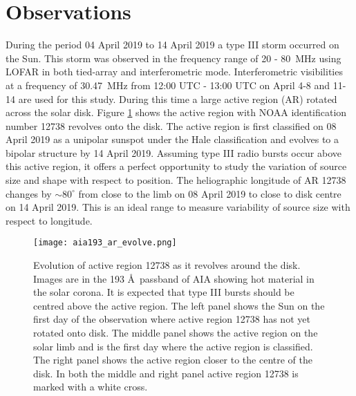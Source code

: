 \section{Observations}
\label{obsvtheory_observations}
During the period 04 April 2019 to 14 April 2019 a type III storm occurred on the Sun. This storm was observed in the frequency range of 20 - 80~MHz using LOFAR in both tied-array and interferometric mode. Interferometric visibilities at a frequency of 30.47~MHz from 12:00 UTC - 13:00 UTC on April 4-8 and 11-14 are used for this study. During this time a large active region (AR) rotated across the solar disk. Figure \ref{fig:ar_evolve} shows the active region with NOAA identification number 12738 revolves onto the disk. The active region is first classified on 08 April 2019 as a unipolar sunspot under the Hale classification and evolves to a bipolar structure by 14 April 2019. Assuming type III radio bursts occur above this active region, it offers a perfect opportunity to study the variation of source size and shape with respect to position. The heliographic longitude of AR 12738 changes by $\sim 80^\circ$ from close to the limb on 08 April 2019 to close to disk centre on 14 April 2019. This is an ideal range to measure variability of source size with respect to longitude.

\begin{figure}
\centering
\texttt{[image: aia193\_ar\_evolve.png]}
\caption[Evolution of active region 12738 as it revolves around the disk.]{Evolution of active region 12738 as it revolves around the disk. Images are in the 193 \AA \ passband of AIA showing hot material in the solar corona. It is expected that type III bursts should be centred above the active region. The left panel shows the Sun on the first day of the observation where active region 12738 has not yet rotated onto disk. The middle panel shows the active region on the solar limb and is the first day where the active region is classified. The right panel shows the active region closer to the centre of the disk. In both the middle and right panel active region 12738 is marked with a white cross.}
\label{fig:ar_evolve}
\end{figure}

